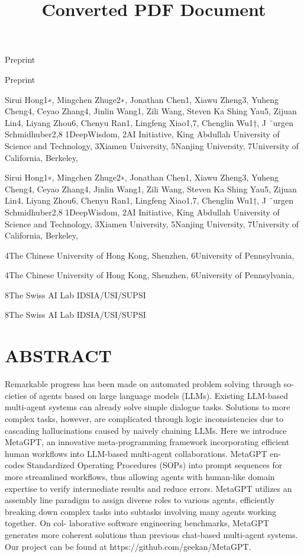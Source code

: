 \documentclass[12pt]{article}
\title{Converted PDF Document}
\author{}
\date{}
\begin{document}
\maketitle

Preprint


Preprint


Sirui Hong1∗, Mingchen Zhuge2∗, Jonathan Chen1, Xiawu Zheng3, Yuheng Cheng4,
Ceyao Zhang4, Jinlin Wang1, Zili Wang, Steven Ka Shing Yau5, Zijuan Lin4,
Liyang Zhou6, Chenyu Ran1, Lingfeng Xiao1,7, Chenglin Wu1†, J ¨urgen Schmidhuber2,8
1DeepWisdom, 2AI Initiative, King Abdullah University of Science and Technology,
3Xiamen University,
5Nanjing University,
7University of California, Berkeley,


Sirui Hong1∗, Mingchen Zhuge2∗, Jonathan Chen1, Xiawu Zheng3, Yuheng Cheng4,
Ceyao Zhang4, Jinlin Wang1, Zili Wang, Steven Ka Shing Yau5, Zijuan Lin4,
Liyang Zhou6, Chenyu Ran1, Lingfeng Xiao1,7, Chenglin Wu1†, J ¨urgen Schmidhuber2,8
1DeepWisdom, 2AI Initiative, King Abdullah University of Science and Technology,
3Xiamen University,
5Nanjing University,
7University of California, Berkeley,


4The Chinese University of Hong Kong, Shenzhen,
6University of Pennsylvania,


4The Chinese University of Hong Kong, Shenzhen,
6University of Pennsylvania,


8The Swiss AI Lab IDSIA/USI/SUPSI


8The Swiss AI Lab IDSIA/USI/SUPSI


\section{ABSTRACT}


Remarkable progress has been made on automated problem solving through so-
cieties of agents based on large language models (LLMs). Existing LLM-based
multi-agent systems can already solve simple dialogue tasks. Solutions to more
complex tasks, however, are complicated through logic inconsistencies due to
cascading hallucinations caused by naively chaining LLMs. Here we introduce
MetaGPT, an innovative meta-programming framework incorporating efficient
human workflows into LLM-based multi-agent collaborations. MetaGPT en-
codes Standardized Operating Procedures (SOPs) into prompt sequences for more
streamlined workflows, thus allowing agents with human-like domain expertise
to verify intermediate results and reduce errors. MetaGPT utilizes an assembly
line paradigm to assign diverse roles to various agents, efficiently breaking down
complex tasks into subtasks involving many agents working together. On col-
laborative software engineering benchmarks, MetaGPT generates more coherent
solutions than previous chat-based multi-agent systems. Our project can be found
at https://github.com/geekan/MetaGPT.
\end{document}
